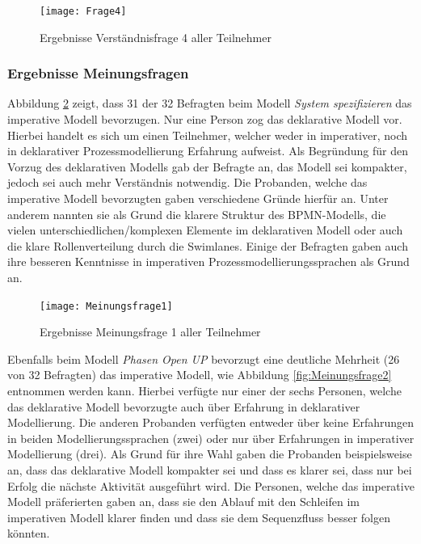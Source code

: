 \begin{figure}[htp]
\begin{center}
  \texttt{[image: Frage4]} %
  \caption{Ergebnisse Verständnisfrage 4 aller Teilnehmer}
  \label{fig:Frage4}
\end{center}
\end{figure}

\clearpage


\subsubsection{Ergebnisse Meinungsfragen}

Abbildung \ref{fig:Meinungsfrage1} zeigt, dass 31 der 32 Befragten beim Modell \textit{System spezifizieren} das imperative Modell bevorzugen. Nur eine Person zog das deklarative Modell vor. Hierbei handelt es sich um einen Teilnehmer, welcher weder in imperativer, noch in deklarativer Prozessmodellierung Erfahrung aufweist. Als Begründung für den Vorzug des deklarativen Modells gab der Befragte an, das Modell sei kompakter, jedoch sei auch mehr Verständnis notwendig.\newline
Die Probanden, welche das imperative Modell bevorzugten gaben verschiedene Gründe hierfür an. Unter anderem nannten sie als Grund die klarere Struktur des BPMN-Modells, die vielen unterschiedlichen/komplexen Elemente im deklarativen Modell oder auch die klare Rollenverteilung durch die Swimlanes. Einige der Befragten gaben auch ihre besseren Kenntnisse in imperativen Prozessmodellierungssprachen als Grund an.\newline

\begin{figure}[htp]
\begin{center}
  \texttt{[image: Meinungsfrage1]} %
  \caption{Ergebnisse Meinungsfrage 1 aller Teilnehmer}
  \label{fig:Meinungsfrage1}
\end{center}
\end{figure}

Ebenfalls beim Modell \textit{Phasen Open UP} bevorzugt eine deutliche Mehrheit (26 von 32 Befragten) das imperative Modell, wie Abbildung \ref{fig:Meinungsfrage2} entnommen werden kann. \newline
Hierbei verfügte nur einer der sechs Personen, welche das deklarative Modell bevorzugte auch über Erfahrung in deklarativer Modellierung. Die anderen Probanden verfügten entweder über keine Erfahrungen in beiden Modellierungssprachen (zwei) oder nur über Erfahrungen in imperativer Modellierung (drei). Als Grund für ihre Wahl gaben die Probanden beispielsweise an, dass das deklarative Modell kompakter sei und dass es klarer sei, dass nur bei Erfolg die nächste Aktivität ausgeführt wird.\newline
Die Personen, welche das imperative Modell präferierten gaben an, dass sie den Ablauf mit den Schleifen im imperativen Modell klarer finden und dass sie dem Sequenzfluss besser folgen könnten.\newline


